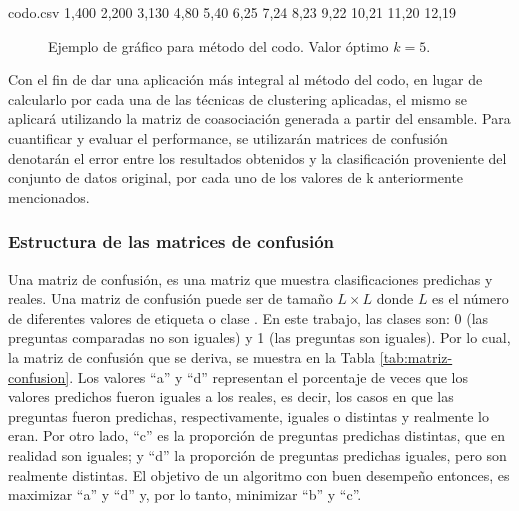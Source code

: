 \begin{filecontents*}{codo.csv}
1,400
2,200
3,130
4,80
5,40
6,25
7,24
8,23
9,22
10,21
11,20
12,19
\end{filecontents*}

\begin{figure}
	\centering
	\scriptsize
	\caption{Ejemplo de gráfico para método del codo. Valor óptimo \(k = 5\).}
	\label{fig:codo}
\end{figure}

\bigskip Con el fin de dar una aplicación más integral al método del codo, en lugar de calcularlo por cada una de las técnicas de clustering aplicadas, el mismo se aplicará utilizando la matriz de coasociación generada a partir del ensamble. Para cuantificar y evaluar el performance, se utilizarán matrices de confusión denotarán el error entre los resultados obtenidos y la clasificación proveniente del conjunto de datos original, por cada uno de los valores de k anteriormente mencionados.

\subsubsection{Estructura de las matrices de confusión}\label{estructurasconfusion}
Una matriz de confusión, es una matriz que muestra clasificaciones predichas y reales. Una matriz de confusión puede ser de tamaño \(L \times L\) donde \(L\) es el número de diferentes valores de etiqueta o clase \citep{provost1998glossary}. En este trabajo, las clases son: 0 (las preguntas comparadas no son iguales) y 1 (las preguntas son iguales). Por lo cual, la matriz de confusión que se deriva, se muestra en la Tabla \ref{tab:matriz-confusion}. Los valores “a” y “d” representan el porcentaje de veces que los valores predichos fueron iguales a los reales, es decir, los casos en que las preguntas fueron predichas, respectivamente, iguales o distintas y realmente lo eran. Por otro lado, “c” es la proporción de preguntas predichas distintas, que en realidad son iguales; y “d” la proporción de preguntas predichas iguales, pero son realmente distintas. El objetivo de un algoritmo con buen desempeño entonces, es maximizar “a” y “d” y, por lo tanto, minimizar “b” y “c”.

